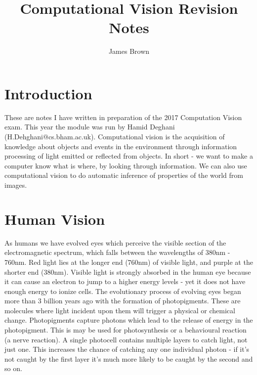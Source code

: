 \documentclass{article}
\title{Computational Vision \linebreak Revision Notes}
\author{James Brown}
\begin{document}
	\maketitle
	\newpage
	\tableofcontents
	\newpage

	\section{Introduction}
	These are notes I have written in preparation of the 2017 Computation Vision exam. This year the module was run by Hamid Deghani (H.Dehghani@cs.bham.ac.uk).
	\linebreak \linebreak
	Computational vision is the acquisition of knowledge about objects and events in the environment through information processing of light emitted or reflected from objects. In short - we want to make a computer know what is where, by looking through information. We can also use computational vision to do automatic inference of properties of the world from images.

	\section{Human Vision}
	\par
	As humans we have evolved eyes which perceive the visible section of the electromagnetic spectrum, which falls between the wavelengths of 380nm - 760nm. Red light lies at the longer end (760nm) of visible light, and purple at the shorter end (380nm). Visible light is strongly absorbed in the human eye because it can cause an electron to jump to a higher energy levels - yet it does not have enough energy to ionize cells. The evolutionary process of evolving eyes began more than 3 billion years ago with the formation of photopigments. These are molecules where light incident upon them will trigger a physical or chemical change. Photopigments capture photons which lead to the release of energy in the photopigment. This is may be used for photosynthesis or a behavioural reaction (a nerve reaction). A single photocell contains multiple layers to catch light, not just one. This increases the chance of catching any one individual photon - if it's not caught by the first layer it's much more likely to be caught by the second and so on.
\end{document}

